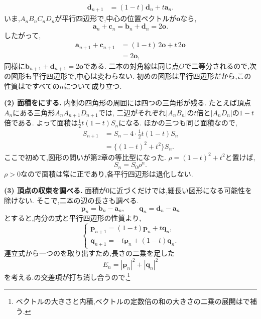 \begin{enumerate}[label=\textbf{問\arabic*.},leftmargin=3.8em,format=\bookitemlink{practice-entrance}{solution}{problem}]
\[\begin{aligned}
        \boldsymbol d_{n+1}&=(1-t)\boldsymbol d_n+t\boldsymbol a_n.
      \end{aligned}
    \]
    いま,$A_nB_nC_nD_n$が平行四辺形で,中心の位置ベクトルが$\boldsymbol o$なら,
    \[
      \boldsymbol a_n+\boldsymbol c_n
      =\boldsymbol b_n+\boldsymbol d_n=2\boldsymbol o.
    \]
    したがって,
    \[
      \begin{aligned}
        \boldsymbol a_{n+1}+\boldsymbol c_{n+1}
        &=(1-t)\,2\boldsymbol o+t\,2\boldsymbol o\\
        &=2\boldsymbol o,
      \end{aligned}
    \]
    同様に$\boldsymbol b_{n+1}+\boldsymbol d_{n+1}=2\boldsymbol o$である.
    二本の対角線は同じ点$O$で二等分されるので,次の図形も平行四辺形で,中心は変わらない.
    初めの図形は平行四辺形だから,この性質はですべての$n$について成り立つ.
    \par\noindent
    \textbf{(2) 面積をにする.}
    内側の四角形の周囲には四つの三角形が残る.
    たとえば頂点$A_n$にある三角形$A_nA_{n+1}D_{n+1}$では,
    二辺がそれぞれ$|A_nB_n|$の$t$倍と$|A_nD_n|$の$1-t$倍である.
    よって面積は$\frac12t(1-t)S_n$になる.
    ほかの三つも同じ面積なので,
    \[
      \begin{aligned}
        S_{n+1}
        &=S_n-4\cdot\frac12t(1-t)S_n\\
        &=\{(1-t)^2+t^2\}S_n.
      \end{aligned}
    \]
    ここで初めて,図形の問いが第2章の等比型になった.
    $\rho=(1-t)^2+t^2$と置けば,
    \[
      S_n=S_0\rho^n.
    \]
    $\rho>0$なので面積は常に正であり,各平行四辺形は退化しない.
    \par\noindent
    \textbf{(3) 頂点の収束を調べる.}
    面積が$0$に近づくだけでは,細長い図形になる可能性を除けない.
    そこで,二本の辺の長さも調べる.
    \[
      \boldsymbol p_n=\boldsymbol b_n-\boldsymbol a_n,
      \qquad
      \boldsymbol q_n=\boldsymbol d_n-\boldsymbol a_n
    \]
    とすると,内分の式と平行四辺形の性質より,
    \[
      \begin{cases}
        \boldsymbol p_{n+1}=(1-t)\boldsymbol p_n+t\boldsymbol q_n,\\
        \boldsymbol q_{n+1}=-t\boldsymbol p_n+(1-t)\boldsymbol q_n.
      \end{cases}
    \]
    連立式から一つのを取り出すため,長さの二乗を足した
    \[
      E_n=|\boldsymbol p_n|^2+|\boldsymbol q_n|^2
    \]
    を考える.の交差項が打ち消し合うので,\footnote{ベクトルの大きさと内積,ベクトルの定数倍の和の大きさの二乗の展開はで補う.}

\end{enumerate}
